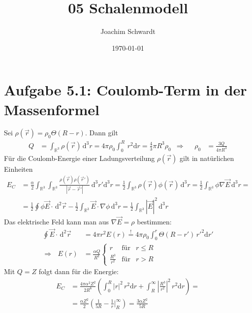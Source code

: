 \documentclass[a4paper,12pt]{article}
\newcommand{\intx}{}
\newcommand{\intr}{}
\newcommand{\kla}{}
\newcommand{\tecxt}{}
\begin{document}
\title{05 Schalenmodell}
\author{Joachim Schwardt}
\date{\today}
\maketitle

\section*{Aufgabe 5.1: Coulomb-Term in der Massenformel}
Sei $\rho(\vec{r})=\rho_0\Theta(R-r)$. Dann gilt
\begin{align*}
Q&=\intr\int_{\mathbb{R}^{3}}{\rho(\vec{r})}\,\mathrm{d}^{3}r=4\pi\rho_0\intx\int_{0}^{R}\,r^2\mathrm{d}r=\frac{4}{3}\pi R^3\rho_0&\Rightarrow &&\rho_0&=\frac{3Q}{4\pi R^3}
\end{align*}
Für die Coulomb-Energie einer Ladungsverteilung $\rho(\vec{r})$ gilt in natürlichen Einheiten
\begin{align*}
E_C&=\frac{\alpha}{2}\intr\int_{\mathbb{R}^{3}}{\intr\int_{\mathbb{R}^{3}}{\frac{\rho(\vec{r})\rho(\vec{r}')}{|\vec{r}-\vec{r}'|}}\,\mathrm{d}^{3}r'}\mathrm{d}^{3}r=\frac{1}{2}\intr\int_{\mathbb{R}^{3}}{\rho(\vec{r})\phi(\vec{r})}\,\mathrm{d}^{3}r=\frac{1}{2}\intr\int_{\mathbb{R}^{3}}{\phi\nabla\vec{E}}\,\mathrm{d}^{3}r=\\
&=\frac{1}{2}\oint\phi\vec{E}\cdot\,\mathrm{d}^2\vec{r}-\frac{1}{2}\intr\int_{\mathbb{R}^{3}}{\vec{E}\cdot\nabla\phi}\,\mathrm{d}^{3}r=\frac{1}{2}\intr\int_{\mathbb{R}^{3}}{|\vec{E}|^2}\,\mathrm{d}^{3}r
\end{align*}
Das elektrische Feld kann man aus $\nabla\vec{E}=\rho$ bestimmen:
\begin{align*}
\oint\vec{E}\cdot\,\mathrm{d}^2\vec{r}&=4\pi r^2E(r)\overset{!}{=}4\pi\rho_0\intx\int_{0}^{r}\Theta(R-r')\,r'^2\mathrm{d}r'\\
\Rightarrow\ \ \ E(r)&=\frac{\alpha Q}{R^3}\left\{\begin{matrix}
r &\tecxt\text{für}&r\le R \\ \frac{R^3}{r^2}&\tecxt\text{für}&r>R
\end{matrix}\right.
\end{align*}
Mit $Q=Z$ folgt dann für die Energie:
\begin{align*}
E_C&=\frac{4\pi\alpha^2Z^2}{2R^6}\kla\left( {\intx\int_{0}^{R}|r|^2\,r^2\mathrm{d}r+\intx\int_{R}^{\infty}\left\vert\frac{R^3}{r^2}\right\vert^2\,r^2\mathrm{d}r} \right)=\\
&=\frac{\alpha Z^2}{2}\kla\left( {\frac{1}{5R}-\frac{1}{r}\Big\vert_R^\infty} \right)=\frac{3\alpha Z^2}{5R}
\end{align*}
\end{document}
